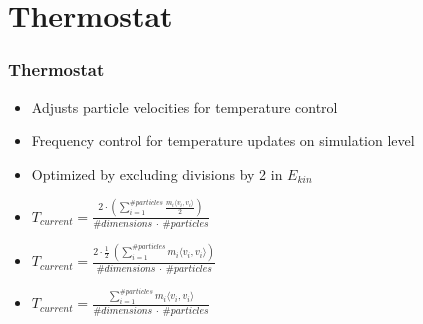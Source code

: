 
\section{Thermostat}
\label{sec:thermo}

\begin{frame}
    \frametitle{Thermostat}
    \begin{itemize}
        \item Adjusts particle velocities for temperature control
        \item Frequency control for temperature updates on simulation level
        \item Optimized by excluding divisions by 2 in $E_{kin}$
        \item $T_{current} = \frac{2 \cdot \left(\sum_{i=1}^{\#particles} \frac{m_i \langle v_i, v_i \rangle}{2}\right)}{\#dimensions\ \cdot\ \#particles}$
        \item $T_{current} = \frac{2 \cdot \frac{1}{2}\ \left(\sum_{i=1}^{\#particles} m_i \langle v_i, v_i \rangle\right)}{\#dimensions\ \cdot\ \#particles}$
        \item $T_{current} = \frac{\sum_{i=1}^{\#particles} m_i \langle v_i, v_i \rangle}{\#dimensions\ \cdot\ \#particles}$
    \end{itemize}
\end{frame}